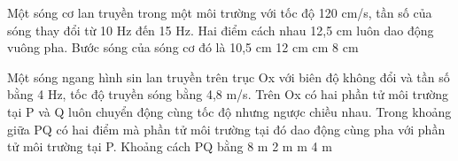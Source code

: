 \begin{ex}%
Một sóng cơ lan truyền trong một môi trường với tốc độ 120 cm/s, tần số của sóng thay đổi từ 10 Hz đến 15 Hz. Hai điểm cách nhau 12,5 cm luôn dao động vuông pha. Bước sóng của sóng cơ đó là
\choice
{10,5 cm}
{12 cm}
{ cm}
{8 cm}
\end{ex} 
\begin{ex}%
Một sóng ngang hình sin lan truyền trên trục Ox với biên độ không đổi và tần số bằng 4 Hz, tốc độ truyền sóng bằng 4,8 m/s. Trên Ox có hai phần tử môi trường tại P và Q luôn chuyển động cùng tốc độ nhưng ngược chiều nhau. Trong khoảng giữa PQ có hai điểm mà phần tử môi trường tại đó dao động cùng pha với phần tử môi trường tại P. Khoảng cách PQ bằng
\choice
{8 m}
{2 m}
{ m}
{4 m}
\end{ex} 

